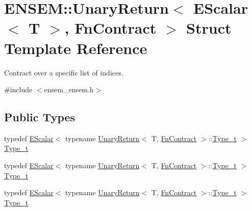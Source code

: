 \hypertarget{structENSEM_1_1UnaryReturn_3_01EScalar_3_01T_01_4_00_01FnContract_01_4}{}\section{E\+N\+S\+EM\+:\+:Unary\+Return$<$ E\+Scalar$<$ T $>$, Fn\+Contract $>$ Struct Template Reference}
\label{structENSEM_1_1UnaryReturn_3_01EScalar_3_01T_01_4_00_01FnContract_01_4}


Contract over a specific list of indices.  




{\ttfamily \#include $<$ensem\+\_\+ensem.\+h$>$}

\subsection*{Public Types}
\begin{DoxyCompactItemize}
\item 
typedef \mbox{\hyperlink{classENSEM_1_1EScalar}{E\+Scalar}}$<$ typename \mbox{\hyperlink{structENSEM_1_1UnaryReturn}{Unary\+Return}}$<$ T, \mbox{\hyperlink{structENSEM_1_1FnContract}{Fn\+Contract}} $>$\+::\mbox{\hyperlink{structENSEM_1_1UnaryReturn_3_01EScalar_3_01T_01_4_00_01FnContract_01_4_a0838f4fd4b6341784128502cc2256180}{Type\+\_\+t}} $>$ \mbox{\hyperlink{structENSEM_1_1UnaryReturn_3_01EScalar_3_01T_01_4_00_01FnContract_01_4_a0838f4fd4b6341784128502cc2256180}{Type\+\_\+t}}
\item 
typedef \mbox{\hyperlink{classENSEM_1_1EScalar}{E\+Scalar}}$<$ typename \mbox{\hyperlink{structENSEM_1_1UnaryReturn}{Unary\+Return}}$<$ T, \mbox{\hyperlink{structENSEM_1_1FnContract}{Fn\+Contract}} $>$\+::\mbox{\hyperlink{structENSEM_1_1UnaryReturn_3_01EScalar_3_01T_01_4_00_01FnContract_01_4_a0838f4fd4b6341784128502cc2256180}{Type\+\_\+t}} $>$ \mbox{\hyperlink{structENSEM_1_1UnaryReturn_3_01EScalar_3_01T_01_4_00_01FnContract_01_4_a0838f4fd4b6341784128502cc2256180}{Type\+\_\+t}}
\item 
typedef \mbox{\hyperlink{classENSEM_1_1EScalar}{E\+Scalar}}$<$ typename \mbox{\hyperlink{structENSEM_1_1UnaryReturn}{Unary\+Return}}$<$ T, \mbox{\hyperlink{structENSEM_1_1FnContract}{Fn\+Contract}} $>$\+::\mbox{\hyperlink{structENSEM_1_1UnaryReturn_3_01EScalar_3_01T_01_4_00_01FnContract_01_4_a0838f4fd4b6341784128502cc2256180}{Type\+\_\+t}} $>$ \mbox{\hyperlink{structENSEM_1_1UnaryReturn_3_01EScalar_3_01T_01_4_00_01FnContract_01_4_a0838f4fd4b6341784128502cc2256180}{Type\+\_\+t}}
\end{DoxyCompactItemize}


